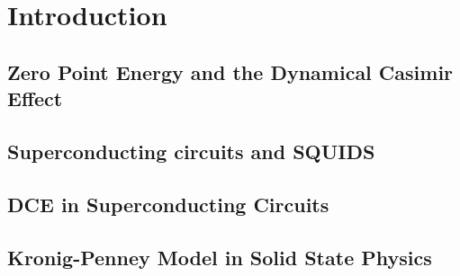 \chapter{Introduction} %

\section{Zero Point Energy and the Dynamical Casimir Effect}\label{sec:ZPE_and_DCE}
\section{Superconducting circuits and SQUIDS}\label{sec:SC_and_SQUIDs}
\section{DCE in Superconducting Circuits}\label{sec:DCE_in_SC}
\section{Kronig-Penney Model in Solid State Physics}\label{sec:KP_in_SS}

